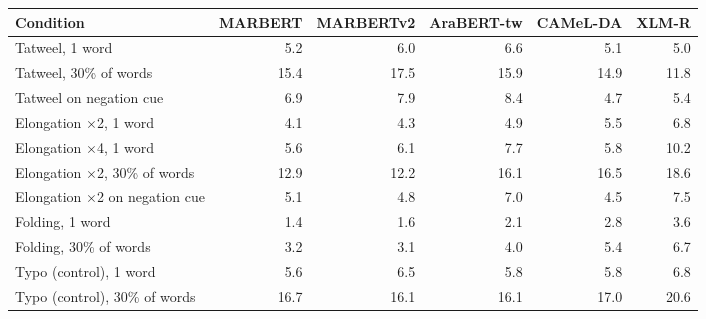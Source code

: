 \begin{tabular}{lrrrrr}
\toprule
Condition & MARBERT & MARBERTv2 & AraBERT-tw & CAMeL-DA & XLM-R \\
\midrule
Tatweel, 1 word & 5.2 & 6.0 & 6.6 & 5.1 & 5.0 \\
Tatweel, 30\% of words & 15.4 & 17.5 & 15.9 & 14.9 & 11.8 \\
Tatweel on negation cue & 6.9 & 7.9 & 8.4 & 4.7 & 5.4 \\
Elongation $\times$2, 1 word & 4.1 & 4.3 & 4.9 & 5.5 & 6.8 \\
Elongation $\times$4, 1 word & 5.6 & 6.1 & 7.7 & 5.8 & 10.2 \\
Elongation $\times$2, 30\% of words & 12.9 & 12.2 & 16.1 & 16.5 & 18.6 \\
Elongation $\times$2 on negation cue & 5.1 & 4.8 & 7.0 & 4.5 & 7.5 \\
Folding, 1 word & 1.4 & 1.6 & 2.1 & 2.8 & 3.6 \\
Folding, 30\% of words & 3.2 & 3.1 & 4.0 & 5.4 & 6.7 \\
Typo (control), 1 word & 5.6 & 6.5 & 5.8 & 5.8 & 6.8 \\
Typo (control), 30\% of words & 16.7 & 16.1 & 16.1 & 17.0 & 20.6 \\
\bottomrule
\end{tabular}
